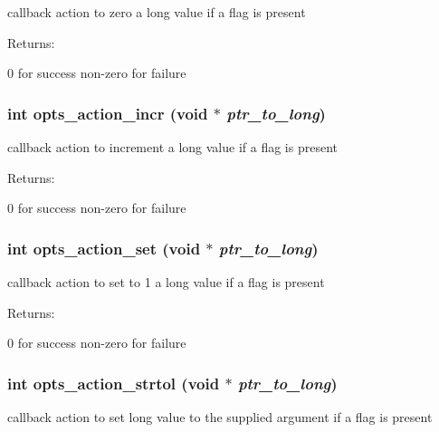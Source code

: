 callback action to zero a long value if a flag is present

\begin{Desc}
\item[Returns: ]\par
0 for success non-zero for failure \end{Desc}
\subsubsection{\setlength{\rightskip}{0pt plus 5cm}int opts\_\-action\_\-incr (void $\ast$ {\em ptr\_\-to\_\-long})}\label{opts__utils_8h_a16}


callback action to increment a long value if a flag is present

\begin{Desc}
\item[Returns: ]\par
0 for success non-zero for failure \end{Desc}
\subsubsection{\setlength{\rightskip}{0pt plus 5cm}int opts\_\-action\_\-set (void $\ast$ {\em ptr\_\-to\_\-long})}\label{opts__utils_8h_a17}


callback action to set to 1 a long value if a flag is present

\begin{Desc}
\item[Returns: ]\par
0 for success non-zero for failure \end{Desc}
\subsubsection{\setlength{\rightskip}{0pt plus 5cm}int opts\_\-action\_\-strtol (void $\ast$ {\em ptr\_\-to\_\-long})}\label{opts__utils_8h_a18}


callback action to set long value to the supplied argument if a flag is present

